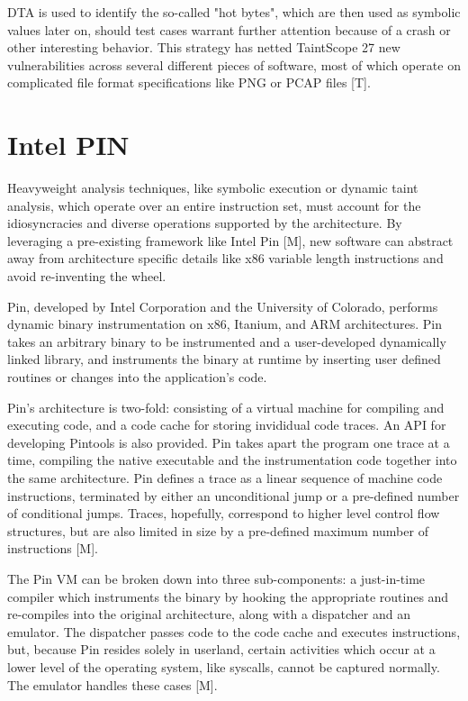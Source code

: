 \documentclass[11pt,expanded,copyright]{fsuthesis}
\begin{document}
DTA is used to identify the so-called "hot bytes", which are then used as symbolic values later on, should test cases warrant further attention because of a crash or other interesting behavior. This strategy has netted TaintScope 27 new vulnerabilities across several different pieces of software, most of which operate on complicated file format specifications like PNG or PCAP files [T].

\section{Intel PIN}

Heavyweight analysis techniques, like symbolic execution or dynamic taint analysis, which operate over an entire instruction set, must account for the idiosyncracies and diverse operations supported by the architecture. By leveraging a pre-existing framework like Intel Pin [M], new software can abstract away from architecture specific details like x86 variable length instructions and avoid re-inventing the wheel.

Pin, developed by Intel Corporation and the University of Colorado, performs dynamic binary instrumentation on x86, Itanium, and ARM architectures. Pin takes an arbitrary binary to be instrumented and a user-developed dynamically linked library, and instruments the binary at runtime by inserting user defined routines or changes into the application's code.

Pin's architecture is two-fold: consisting of a virtual machine for compiling and executing code, and a code cache for storing invididual code traces. An API for developing Pintools is also provided. Pin takes apart the program one trace at a time, compiling the native executable and the instrumentation code together into the same architecture. Pin defines a trace as a linear sequence of machine code instructions, terminated by either an unconditional jump or a pre-defined number of conditional jumps. Traces, hopefully, correspond to higher level control flow structures, but are also limited in size by a pre-defined maximum number of instructions [M].

The Pin VM can be broken down into three sub-components: a just-in-time compiler which instruments the binary by hooking the appropriate routines and re-compiles into the original architecture, along with a dispatcher and an emulator. The dispatcher passes code to the code cache and executes instructions, but, because Pin resides solely in userland, certain activities which occur at a lower level of the operating system, like syscalls, cannot be captured normally. The emulator handles these cases [M].
\end{document}
